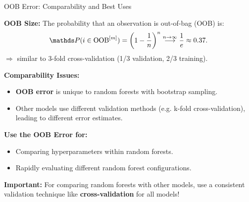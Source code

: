 \documentclass[11pt,compress,t,notes=noshow,xcolor=table]{beamer}
\begin{document}
\begin{vbframe}{OOB Error: Comparability and Best Uses}

\textbf{OOB Size:} The probability that an observation is out-of-bag (OOB) is:
$$\P(i \in \text{OOB}^{[m]}) = \left(1 - \frac{1}{n}\right)^n \stackrel{n \to \infty}{\longrightarrow} \frac{1}{e} \approx 0.37.$$
$\Rightarrow$ similar to 3-fold cross-validation (1/3 validation, 2/3 training).

\textbf{Comparability Issues:}
\begin{itemize}
\item \textbf{OOB error} is unique to random forests with bootstrap sampling.
\item Other models use different validation methods (e.g. k-fold cross-validation), leading to different error estimates.
\end{itemize}

\textbf{Use the OOB Error for:}
\begin{itemize}
\item Comparing hyperparameters within random forests.
\item Rapidly evaluating different random forest configurations.
\end{itemize}

\textbf{Important:} For comparing random forests with other models, use a consistent validation technique like \textbf{cross-validation} for all models!

\end{vbframe}

\endlecture
\end{document}
